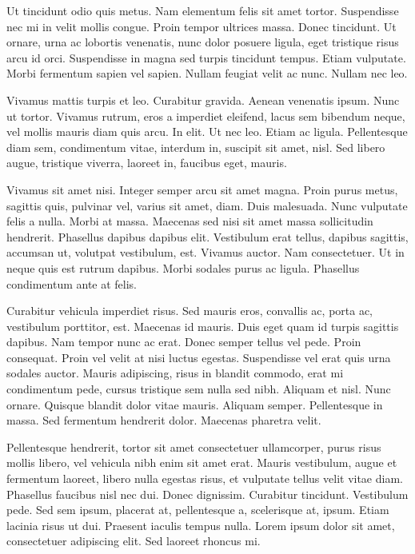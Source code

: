 \documentclass[printmode,mgr,pl]{mgr}
\begin{document}
Ut tincidunt odio quis metus. Nam elementum felis sit amet
tortor. Suspendisse nec mi in velit mollis congue. Proin tempor
ultrices massa. Donec tincidunt. Ut ornare, urna ac lobortis
venenatis, nunc dolor posuere ligula, eget tristique risus arcu id
orci. Suspendisse in magna sed turpis tincidunt tempus. Etiam
vulputate. Morbi fermentum sapien vel sapien. Nullam feugiat velit ac
nunc. Nullam nec leo.

Vivamus mattis turpis et leo. Curabitur gravida. Aenean venenatis
ipsum. Nunc ut tortor. Vivamus rutrum, eros a imperdiet eleifend,
lacus sem bibendum neque, vel mollis mauris diam quis arcu. In
elit. Ut nec leo. Etiam ac ligula. Pellentesque diam sem, condimentum
vitae, interdum in, suscipit sit amet, nisl. Sed libero augue,
tristique viverra, laoreet in, faucibus eget, mauris.

Vivamus sit amet nisi. Integer semper arcu sit amet magna. Proin purus
metus, sagittis quis, pulvinar vel, varius sit amet, diam. Duis
malesuada. Nunc vulputate felis a nulla. Morbi at massa. Maecenas sed
nisi sit amet massa sollicitudin hendrerit. Phasellus dapibus dapibus
elit. Vestibulum erat tellus, dapibus sagittis, accumsan ut, volutpat
vestibulum, est. Vivamus auctor. Nam consectetuer. Ut in neque quis
est rutrum dapibus. Morbi sodales purus ac ligula. Phasellus
condimentum ante at felis.

Curabitur vehicula imperdiet risus. Sed mauris eros, convallis ac,
porta ac, vestibulum porttitor, est. Maecenas id mauris. Duis eget
quam id turpis sagittis dapibus. Nam tempor nunc ac erat. Donec semper
tellus vel pede. Proin consequat. Proin vel velit at nisi luctus
egestas. Suspendisse vel erat quis urna sodales auctor. Mauris
adipiscing, risus in blandit commodo, erat mi condimentum pede, cursus
tristique sem nulla sed nibh. Aliquam et nisl. Nunc ornare. Quisque
blandit dolor vitae mauris. Aliquam semper. Pellentesque in massa. Sed
fermentum hendrerit dolor. Maecenas pharetra velit.

Pellentesque hendrerit, tortor sit amet consectetuer ullamcorper,
purus risus mollis libero, vel vehicula nibh enim sit amet
erat. Mauris vestibulum, augue et fermentum laoreet, libero nulla
egestas risus, et vulputate tellus velit vitae diam. Phasellus
faucibus nisl nec dui. Donec dignissim. Curabitur
tincidunt. Vestibulum pede. Sed sem ipsum, placerat at, pellentesque
a, scelerisque at, ipsum. Etiam lacinia risus ut dui. Praesent iaculis
tempus nulla. Lorem ipsum dolor sit amet, consectetuer adipiscing
elit. Sed laoreet rhoncus mi.
\end{document}
